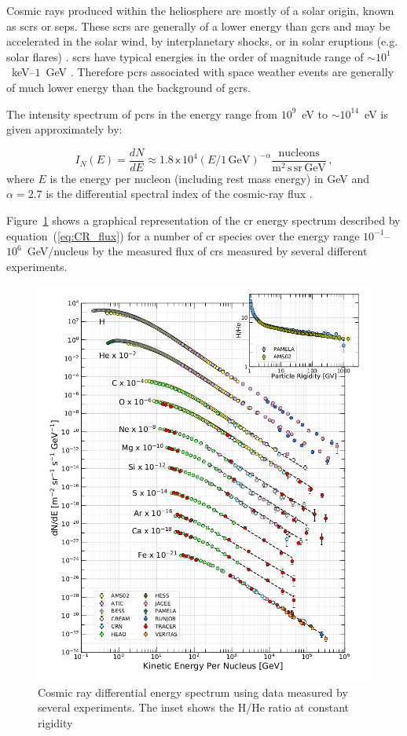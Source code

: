 Cosmic rays produced within the heliosphere are mostly of a solar origin, known as \glspl{scr} or \glspl{sep}. These \glspl{scr} are generally of a lower energy than \glspl{gcr} and may be accelerated in the solar wind, by interplanetary shocks, or in solar eruptions (e.g. solar flares) \citep{giacalone_energetic_2010}. \glspl{scr} have typical energies in the order of magnitude range of $\sim10^{1}$~keV--$1$~GeV \citep{chilingarian_galactic_2003, bruno_solar_2018}. Therefore \glspl{pcr} associated with space weather events are generally of much lower energy than the background of \glspl{gcr}.

The intensity spectrum of \glspl{pcr} in the energy range from $10^9$~eV to $\sim10^{14}$~eV is given approximately by:

\begin{equation}
\label{eq:CR_flux}
I_N(E) = \frac{dN}{dE} \approx 1.8 \, \mathsf{x} \, 10^4 (E/1 \, \mathrm{GeV})^{-\alpha} \frac{\mathrm{nucleons}}{{\mathrm{m^2 \, s  \, sr \, GeV}}} \, ,
\end{equation}
%
where $E$ is the energy per nucleon (including rest mass energy) in GeV and $\alpha=2.7$ is the differential spectral index of the cosmic-ray flux \citep{particle_data_group_review_2020}. 

Figure~\ref{fig:CR_spec} shows a graphical representation of the \gls{cr} energy spectrum described by equation~(\ref{eq:CR_flux}) for a number of \gls{cr} species over the energy range $10^{-1}$--$10^{6}$~GeV/nucleus by the measured flux of \glspl{cr} measured by several different experiments.

\begin{figure}[ht!]
	\centering
	\includegraphics[width=0.8\columnwidth]{CR_spectrum.png}
	\caption{ Cosmic ray differential energy spectrum using data measured by several experiments. The inset shows the H/He ratio at constant rigidity \citep{particle_data_group_review_2020} }
	\label{fig:CR_spec}
\end{figure}

